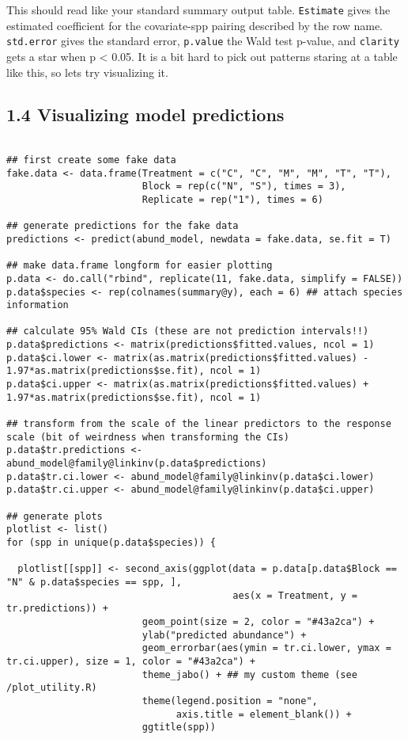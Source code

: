 \documentclass[11pt]{article}
\begin{document}
This should read like your standard summary output table. \texttt{Estimate} gives the estimated coefficient for the covariate-spp pairing described by the row name. \texttt{std.error} gives the standard error, \texttt{p.value} the Wald test p-value, and \texttt{clarity} gets a star when p < 0.05. It is a bit hard to pick out patterns staring at a table like this, so lets try visualizing it.

\subsection*{1.4 Visualizing model predictions}
\label{sec:orgfac5f21}

\begin{verbatim}

## first create some fake data
fake.data <- data.frame(Treatment = c("C", "C", "M", "M", "T", "T"),
                        Block = rep(c("N", "S"), times = 3),
                        Replicate = rep("1"), times = 6)

## generate predictions for the fake data
predictions <- predict(abund_model, newdata = fake.data, se.fit = T)

## make data.frame longform for easier plotting
p.data <- do.call("rbind", replicate(11, fake.data, simplify = FALSE))
p.data$species <- rep(colnames(summary@y), each = 6) ## attach species information

## calculate 95% Wald CIs (these are not prediction intervals!!)
p.data$predictions <- matrix(predictions$fitted.values, ncol = 1)
p.data$ci.lower <- matrix(as.matrix(predictions$fitted.values) - 1.97*as.matrix(predictions$se.fit), ncol = 1)
p.data$ci.upper <- matrix(as.matrix(predictions$fitted.values) + 1.97*as.matrix(predictions$se.fit), ncol = 1)

## transform from the scale of the linear predictors to the response scale (bit of weirdness when transforming the CIs)
p.data$tr.predictions <- abund_model@family@linkinv(p.data$predictions)
p.data$tr.ci.lower <- abund_model@family@linkinv(p.data$ci.lower)
p.data$tr.ci.upper <- abund_model@family@linkinv(p.data$ci.upper)

## generate plots
plotlist <- list()
for (spp in unique(p.data$species)) {

  plotlist[[spp]] <- second_axis(ggplot(data = p.data[p.data$Block == "N" & p.data$species == spp, ],
                                        aes(x = Treatment, y = tr.predictions)) +
                        geom_point(size = 2, color = "#43a2ca") +
                        ylab("predicted abundance") +
                        geom_errorbar(aes(ymin = tr.ci.lower, ymax = tr.ci.upper), size = 1, color = "#43a2ca") +
                        theme_jabo() + ## my custom theme (see /plot_utility.R)
                        theme(legend.position = "none",
                              axis.title = element_blank()) +
                        ggtitle(spp))


\end{verbatim}
\end{document}
